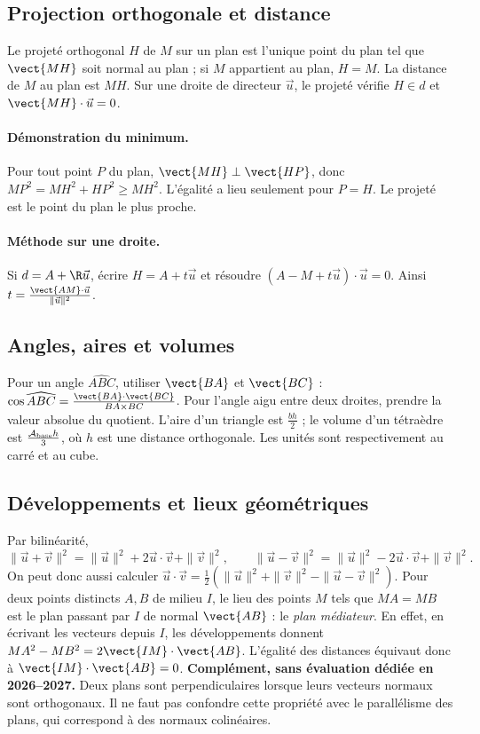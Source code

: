 \subsection{Projection orthogonale et distance}
Le projeté orthogonal $H$ de $M$ sur un plan est l'unique point du plan tel que $\vect{MH}$ soit normal au plan ; si $M$ appartient au plan, $H=M$. La distance de $M$ au plan est $MH$. Sur une droite de directeur $\vec u$, le projeté vérifie $H\in d$ et $\vect{MH}\cdot\vec u=0$.
\paragraph{Démonstration du minimum.} Pour tout point $P$ du plan, $\vect{MH}\perp\vect{HP}$, donc $MP^2=MH^2+HP^2\ge MH^2$. L'égalité a lieu seulement pour $P=H$. Le projeté est le point du plan le plus proche.
\paragraph{Méthode sur une droite.} Si $d=A+\R\vec u$, écrire $H=A+t\vec u$ et résoudre $(A-M+t\vec u)\cdot\vec u=0$. Ainsi $t=\frac{\vect{AM}\cdot\vec{u}}{\lVert\vec u\rVert^2}$.
\subsection{Angles, aires et volumes}
Pour un angle $\widehat{ABC}$, utiliser $\vect{BA}$ et $\vect{BC}$ : $\cos \widehat{ABC}=\frac{\vect{BA}\cdot\vect{BC}}{BA\times BC}$. Pour l'angle aigu entre deux droites, prendre la valeur absolue du quotient.
L'aire d'un triangle est $\frac{bh}{2}$ ; le volume d'un tétraèdre est $\frac{\mathcal{A}_{\rm base}h}{3}$, où $h$ est une distance orthogonale. Les unités sont respectivement au carré et au cube.
\subsection{Développements et lieux géométriques}
Par bilinéarité,
\[\|\vec u+\vec v\|^2=\|\vec u\|^2+2\vec u\cdot\vec v+\|\vec v\|^2,\qquad
\|\vec u-\vec v\|^2=\|\vec u\|^2-2\vec u\cdot\vec v+\|\vec v\|^2.\]
On peut donc aussi calculer $\vec u\cdot\vec v=\frac12(\|\vec u\|^2+\|\vec v\|^2-\|\vec u-\vec v\|^2)$.
Pour deux points distincts $A,B$ de milieu $I$, le lieu des points $M$ tels que $MA=MB$ est le plan passant par $I$ de normal $\vect{AB}$ : le \emph{plan médiateur}. En effet, en écrivant les vecteurs depuis $I$, les développements donnent $MA^2-MB^2=2\vect{IM}\cdot\vect{AB}$. L'égalité des distances équivaut donc à $\vect{IM}\cdot\vect{AB}=0$.
\textbf{Complément, sans évaluation dédiée en 2026--2027.} Deux plans sont perpendiculaires lorsque leurs vecteurs normaux sont orthogonaux. Il ne faut pas confondre cette propriété avec le parallélisme des plans, qui correspond à des normaux colinéaires.


